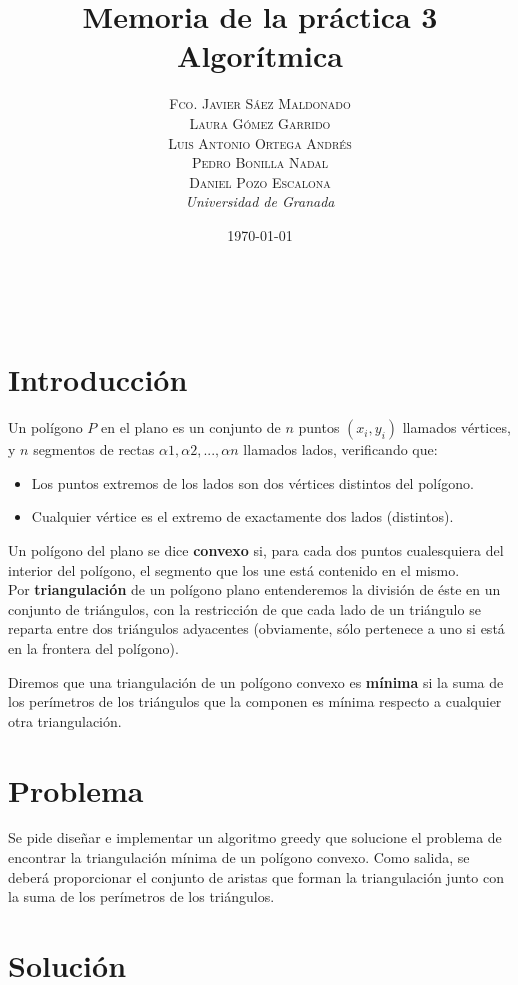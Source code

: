 \documentclass[a4paper, 11pt]{article}
\title{\textbf{Memoria de la práctica 3}\\ %
Algorítmica} %
\author{\textsc{Fco. Javier Sáez Maldonado}\\ %
\textsc{Laura Gómez Garrido}\\
\textsc{Luis Antonio Ortega Andrés}\\
\textsc{Pedro Bonilla Nadal}\\
\textsc{Daniel Pozo Escalona}\vspace{2cm}
\\{\textit{Universidad de Granada}}} %
\date{\today} %
\makeatletter
\renewcommand{\maketitle}{
  \begin{flushright} %
  
  {\LARGE\@title} %
  
  \vspace{50pt} %
  
  {\large\@author} %
  \\\@date %
  \vspace{40pt} %
  \end{flushright}
}
\makeatother
\begin{document}
\maketitle %


{\parskip=2pt
  \tableofcontents
}
\pagebreak



\section{Introducción}

Un polígono $P$ en el plano es un conjunto de $n$ puntos $(x_i, y_i)$ llamados vértices, y $n$ segmentos de rectas ${α1 , α2 , . . . , αn }$ llamados lados, verificando que:

\begin{itemize}
	\item Los puntos extremos de los lados son dos vértices distintos del polígono. 
	\item Cualquier vértice es el extremo de exactamente dos lados (distintos).
\end{itemize}

Un polígono del plano se dice \textbf{convexo} si, para cada dos puntos cualesquiera del interior del polígono, el segmento que los une está contenido en el mismo.\\
 Por \textbf{triangulación} de un polígono plano entenderemos la división de éste en un conjunto de triángulos, con la restricción de que cada lado de un triángulo se reparta entre dos triángulos adyacentes (obviamente, sólo pertenece a uno si está en la frontera del polígono).

Diremos que una triangulación de un polígono convexo es \textbf{mínima} si la suma de los perímetros de los triángulos que la componen es mínima respecto a cualquier otra triangulación.

\section{Problema}

Se pide diseñar e implementar un algoritmo greedy que solucione el problema de encontrar la triangulación mínima de un polígono convexo. Como salida, se deberá proporcionar el conjunto de aristas que forman la triangulación junto con la suma de los perímetros de los triángulos.

\section{Solución}
\end{document}
